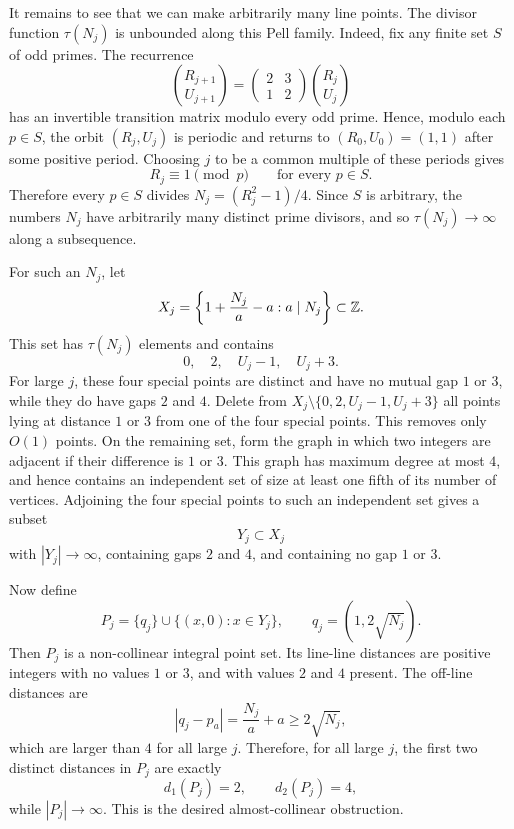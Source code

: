\documentclass[11pt]{article}
\newcommand{\ZZ}{\mathbb Z}
\begin{document}
It remains to see that we can make arbitrarily many line points.  The divisor
function \(\tau(N_j)\) is unbounded along this Pell family.  Indeed, fix any
finite set \(S\) of odd primes.  The recurrence
\[
        \binom{R_{j+1}}{U_{j+1}}
        =
        \begin{pmatrix}2&3\\1&2\end{pmatrix}
        \binom{R_j}{U_j}
\]
has an invertible transition matrix modulo every odd prime.  Hence, modulo each
\(p\in S\), the orbit \((R_j,U_j)\) is periodic and returns to
\((R_0,U_0)=(1,1)\) after some positive period.  Choosing \(j\) to be a common
multiple of these periods gives
\[
        R_j\equiv1\pmod p
        \qquad\text{for every }p\in S.
\]
Therefore every \(p\in S\) divides \(N_j=(R_j^2-1)/4\).  Since \(S\) is
arbitrary, the numbers \(N_j\) have arbitrarily many distinct prime divisors,
and so \(\tau(N_j)\to\infty\) along a subsequence.

For such an \(N_j\), let
\[
        X_j=\left\{1+\frac{N_j}{a}-a:\\ a\mid N_j\right\}\subset\ZZ.
\]
This set has \(\tau(N_j)\) elements and contains
\[
        0,
        \quad 2,
        \quad U_j-1,
        \quad U_j+3.
\]
For large \(j\), these four special points are distinct and have no mutual gap
\(1\) or \(3\), while they do have gaps \(2\) and \(4\).  Delete from
\(X_j\setminus\{0,2,U_j-1,U_j+3\}\) all points lying at distance \(1\) or \(3\)
from one of the four special points.  This removes only \(O(1)\) points.
On the remaining set, form the graph in which two integers are adjacent if
their difference is \(1\) or \(3\).  This graph has maximum degree at most
\(4\), and hence contains an independent set of size at least one fifth of its
number of vertices.  Adjoining the four special points to such an independent
set gives a subset
\[
        Y_j\subset X_j
\]
with \(|Y_j|\to\infty\), containing gaps \(2\) and \(4\), and containing no gap
\(1\) or \(3\).

Now define
\[
        P_j=\{q_j\}\cup\{(x,0):x\in Y_j\},
        \qquad q_j=(1,2\sqrt{N_j}).
\]
Then \(P_j\) is a non-collinear integral point set.  Its line-line distances
are positive integers with no values \(1\) or \(3\), and with values \(2\) and
\(4\) present.  The off-line distances are
\[
        |q_j-p_a|=\frac{N_j}{a}+a\ge 2\sqrt{N_j},
\]
which are larger than \(4\) for all large \(j\).  Therefore, for all large
\(j\), the first two distinct distances in \(P_j\) are exactly
\[
        d_1(P_j)=2,
        \qquad
        d_2(P_j)=4,
\]
while \(|P_j|\to\infty\).  This is the desired almost-collinear obstruction.
\end{document}
